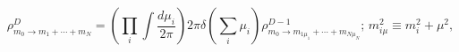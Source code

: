 \begin{equation}
 \rho^D_{m_0\rightarrow m_1+\cdots+m_N}\!=\!\left(\!\prod_i\!\int\!
 \frac{d\mu_i}{2\pi}\!\right)2\pi
 \delta(\sum_i \mu_i)\rho^{D-1}_{m_0\rightarrow\!m_{1\mu_1}\!+\cdots+m_{N\mu_N}};
 \, m^2_{i\mu}\!\equiv\! m_i^2\!+\!\mu^2,
\end{equation}

